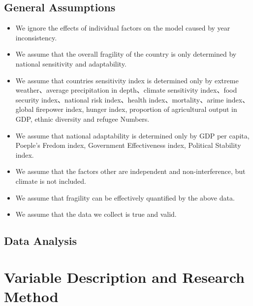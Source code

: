 \documentclass{mcmthesis}
\begin{document}
\subsection{General Assumptions}
\begin{itemize}
  \item We ignore the effects of individual factors on the model caused by year inconsistency.
  \item We assume that the overall fragility of the country is only determined by national sensitivity and adaptability.
  \item We assume that countries sensitivity index is determined only by extreme weather、average precipitation in depth、climate sensitivity index、food security index、national risk index、health index、mortality、arime index、global firepower index, hunger index,  proportion of agricultural output in GDP, ethnic diversity and refugee Numbers.
  \item We assume that national adaptability is determined only by GDP per capita, Poeple's Fredom index, Government Effectiveness index, Political Stability index.
  \item We assume that the factors other are independent and non-interference, but climate is not included.
  \item We assume that fragility can be effectively quantified by the above data.
  \item We assume that the data we collect is true and valid.
\end{itemize}
\subsection{Data Analysis}


\section{Variable Description and Research Method}
\end{document}
